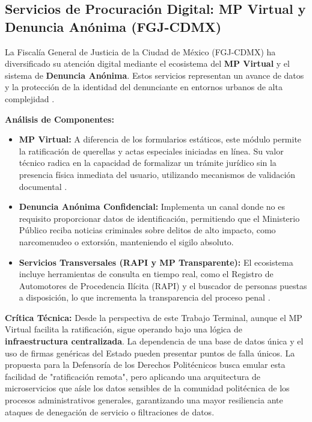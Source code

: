 \subsection{Servicios de Procuración Digital: MP Virtual y Denuncia Anónima (FGJ-CDMX)}

\begin{flushleft}
\justifying
La Fiscalía General de Justicia de la Ciudad de México (FGJ-CDMX) ha diversificado su atención digital mediante el ecosistema del \textbf{MP Virtual} y el sistema de \textbf{Denuncia Anónima}. Estos servicios representan un avance de datos y la protección de la identidad del denunciante en entornos urbanos de alta complejidad \cite{11}.

\textbf{Análisis de Componentes:}
\begin{itemize}
    \item \textbf{MP Virtual:} A diferencia de los formularios estáticos, este módulo permite la ratificación de querellas y actas especiales iniciadas en línea. Su valor técnico radica en la capacidad de formalizar un trámite jurídico sin la presencia física inmediata del usuario, utilizando mecanismos de validación documental \cite{12}.
    \item \textbf{Denuncia Anónima Confidencial:} Implementa un canal donde no es requisito proporcionar datos de identificación, permitiendo que el Ministerio Público reciba noticias criminales sobre delitos de alto impacto, como narcomenudeo o extorsión, manteniendo el sigilo absoluto.
    \item \textbf{Servicios Transversales (RAPI y MP Transparente):} El ecosistema incluye herramientas de consulta en tiempo real, como el Registro de Automotores de Procedencia Ilícita (RAPI) y el buscador de personas puestas a disposición, lo que incrementa la transparencia del proceso penal \cite{11}.
\end{itemize}

\textbf{Crítica Técnica:}
Desde la perspectiva de este Trabajo Terminal, aunque el MP Virtual facilita la ratificación, sigue operando bajo una lógica de \textbf{infraestructura centralizada}. La dependencia de una base de datos única y el uso de firmas genéricas del Estado pueden presentar puntos de falla únicos. La propuesta para la Defensoría de los Derechos Politécnicos busca emular esta facilidad de "ratificación remota", pero aplicando una arquitectura de microservicios que aísle los datos sensibles de la comunidad politécnica de los procesos administrativos generales, garantizando una mayor resiliencia ante ataques de denegación de servicio o filtraciones de datos.
\end{flushleft}

